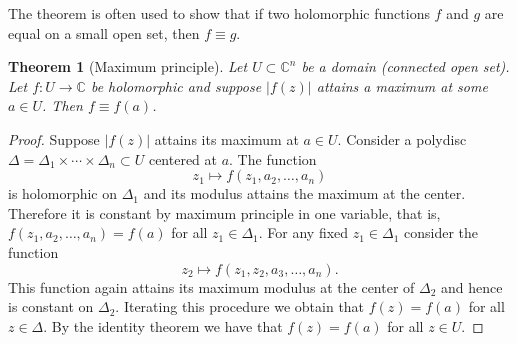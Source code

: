 \documentclass[12pt,openany]{book}
\newcommand{\sabs}[1]{\lvert {#1} \rvert}
\newcommand{\C}{{\mathbb{C}}}
\theoremstyle{plain}
\newtheorem{thm}{Theorem}[section]
\theoremstyle{remark}
\theoremstyle{definition}
\theoremstyle{exercise}
\theoremstyle{example}
\begin{document}
The theorem is often used to show that 
if two holomorphic functions $f$ and $g$ 
are equal on a small open set,
then $f \equiv g$.

\begin{thm}[Maximum principle]
Let $U \subset \C^n$ be a domain (connected open set).
Let $f \colon U \to \C$ be holomorphic and suppose $\sabs{f(z)}$
attains a maximum at some $a \in U$.  Then $f \equiv f(a)$.
\end{thm}

\begin{proof}
Suppose $\sabs{f(z)}$ attains its maximum at $a \in U$.  Consider a polydisc
$\Delta = \Delta_1 \times \cdots \times \Delta_n \subset U$
centered at $a$.  The function
\begin{equation*}
z_1 \mapsto f(z_1,a_2,\ldots,a_n) 
\end{equation*}
is holomorphic
on $\Delta_1$ and its modulus attains the maximum
at the center.  Therefore it is constant by maximum principle in one variable,
that is, $f(z_1,a_2,\ldots,a_n)  = f(a)$ for all $z_1 \in \Delta_1$.  For
any fixed $z_1
\in \Delta_1$ consider the function
\begin{equation*}
z_2 \mapsto f(z_1,z_2,a_3,\ldots,a_n)  .
\end{equation*}
This function again attains its maximum modulus at the center of $\Delta_2$
and hence is constant on $\Delta_2$.  Iterating this procedure we obtain
that $f(z) = f(a)$ for all $z \in \Delta$.  By the identity theorem we have
that $f(z) = f(a)$ for all $z \in U$.
\end{proof}
\end{document}
